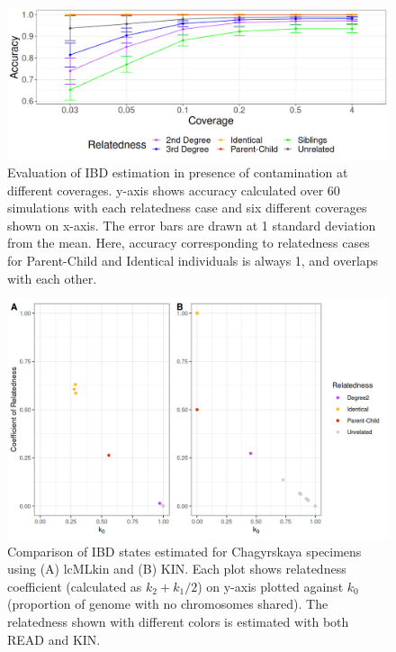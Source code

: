 \documentclass[12pt, letterpaper]{article}
\begin{document}
\begin{figure}[h!]
    \centering
    \includegraphics[width=18cm]{plots/plotimg/plot_IBDaccuracy_cont.png}
    \caption{Evaluation of IBD estimation in presence of contamination at different coverages. y-axis shows accuracy calculated over 60 simulations with each relatedness case and six different coverages shown on x-axis. The error bars are drawn at 1 standard deviation from the mean. Here, accuracy corresponding to relatedness cases for Parent-Child and Identical individuals is always 1, and overlaps with each other.}
    \label{figS11:ibd_asc}
\end{figure}
\begin{figure}[h!]
    \centering
    \includegraphics[width=18cm]{supplementary_info/plots/lcPlot.png}
    \caption{Comparison of IBD states estimated for Chagyrskaya specimens using (A) lcMLkin and (B) KIN. Each plot shows relatedness coefficient (calculated as $k_2+k_1/2$) on y-axis plotted against $k_0$ (proportion of genome with no chromosomes shared).
    The relatedness shown with different colors is estimated with both READ and KIN.}
    \label{figS6:Chagyrskaya_ibd}
\end{figure}
\end{document}
